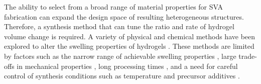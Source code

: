 The ability to select from a broad range of material properties for SVA fabrication can expand the design space of resulting heterogeneous structures. Therefore, a synthesis method that can tune the ratio and rate of hydrogel volume change is required. 
A variety of physical and chemical methods have been explored to alter the swelling properties of hydrogels \cite{Zhang2008,Imran2010}. 
These methods are limited by factors such as the narrow range of achievable swelling properties \cite{Kim2016a,Gan2001}, large trade-offs in mechanical properties \cite{Li2018,Depa2012}, long processing times \cite{Zhou2018b, Ma2014}, and a need for careful control of synthesis conditions such as temperature \cite{Otsuka2012} and precursor additives \cite{Bodenberger2016}.\\ 
